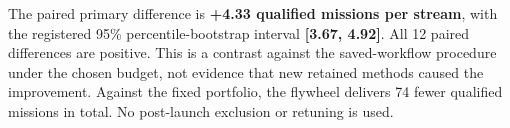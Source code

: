 The paired primary difference is \textbf{+4.33 qualified missions per stream}, with the registered 95\% percentile-bootstrap interval \textbf{[3.67, 4.92]}. All 12 paired differences are positive. This is a contrast against the saved-workflow procedure under the chosen budget, not evidence that new retained methods caused the improvement. Against the fixed portfolio, the flywheel delivers 74 fewer qualified missions in total. No post-launch exclusion or retuning is used.
